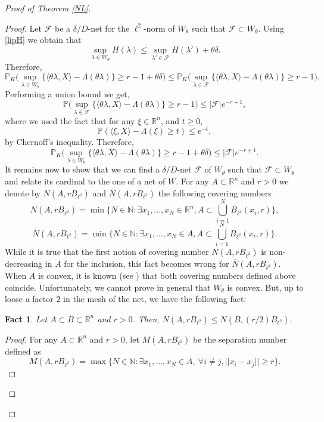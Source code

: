 \documentclass[aop,preprint]{imsart}
\newcommand\NN{\mathbb{N}}
\newcommand\RR{\mathbb{R}}
\newcommand\PP{\mathbb{P}}
\numberwithin{equation}{section}
\theoremstyle{definition}
\theoremstyle{plain}
\newtheorem{fact}[Def]{Fact}
\theoremstyle{remark}
\begin{document}
\begin{proof}[Proof of Theorem \ref{NL}]
\begin{proof}
Let $\mathcal{F}$ be a $\delta/D$-net for the $\ell^2$-norm of $W_\theta$ such that $\mathcal{F}\subset W_\theta$. Using \eqref{lipH} we obtain that
$$ \sup_{\lambda \in W_\theta} H(\lambda) \leq \sup_{\lambda'\in \mathcal{F}} H(\lambda') + \theta \delta.$$
Therefore, 
$$\PP_K\big( \sup_{\lambda \in W_{\theta}} \{ \langle\theta  \lambda, X\rangle - \Lambda(\theta\lambda) \} \geq r-1 +\theta \delta\big) \leq \PP_K\big( \sup_{\lambda \in \mathcal{F} } \{ \langle\theta \lambda, X\rangle - \Lambda(\theta\lambda) \} \geq r-1 \big).$$
Performing a union bound we get,
$$ \PP\big( \sup_{\lambda \in \mathcal{F}} \{ \langle \theta \lambda, X\rangle - \Lambda(\theta\lambda) \} \geq r-1 \big) \leq |\mathcal{F}| e^{-r+1},$$
where we used the fact that for any $\xi \in \RR^n$, and $t \geq 0$,
$$\PP(\langle \xi, X\rangle - \Lambda(\xi) \geq t )\leq e^{-t},$$
by Chernoff's inequality. Therefore,
\begin{equation}\label{nettheta}\PP_K\big( \sup_{\lambda \in W_{\theta}} \{ \langle\theta  \lambda, X\rangle - \Lambda(\theta\lambda) \} \geq r-1 +\theta \delta\big) \leq  |\mathcal{F}| e^{-r+1}.\end{equation}
 It remains now to show that we can find a $\delta/D$-net $\mathcal{F}$ of $W_\theta$ such that $\mathcal{F} \subset W_\theta$ and relate its cardinal to the one of a net of $W$.  For any $A\subset \RR^n$ and $r>0$ we denote by $N(A,rB_{\ell^2})$ and $\overline{N}(A,rB_{\ell^2})$ the following covering numbers
$$ N(A,rB_{\ell^2}) = \min \big\{ N \in\NN : \exists x_1,\ldots,x_N \in \RR^n, A \subset \bigcup_{i=1}^N B_{\ell^2}(x_i, r) \big\},$$
$$ \overline{N}(A,rB_{\ell^2}) = \min \big\{ N\in \NN : \exists x_1,\ldots,x_N \in A, A \subset \bigcup_{i=1}^N B_{\ell^2}(x_i, r) \big\}.$$
While it is true that the first notion of covering number $N(A,rB_{\ell^2})$ is non-decreasing in $A$ for the inclusion, this fact becomes wrong for $\overline{N}(A,rB_{\ell^2})$. When $A$ is convex, it is known (see \cite[Fact 4.1.4]{AGM}) that both covering numbers defined above coincide. Unfortunately, we cannot prove in general that $W_\theta$ is convex. But, up to loose a factor $2$ in the mesh of the net, we have the following fact:
\begin{fact}\label{factcovering} Let $A\subset B \subset \RR^n$ and $r>0$. Then, $  \overline{N}(A,rB_{\ell^2}) \leq N(B,(r/2)B_{\ell^2})$.
\end{fact}
\begin{proof}
For any $A\subset \RR^n$ and $r>0$, let  $M(A,rB_{\ell^2})$ be the separation number defined as 
$$ M(A,rB_{\ell^2}) = \max\big\{ N \in \NN : \exists x_1,\ldots,x_N \in A, \ \forall i\neq j, ||x_i-x_j||\geq r\big\}.$$

\end{proof}
\end{proof}
\end{proof}
\end{document}
